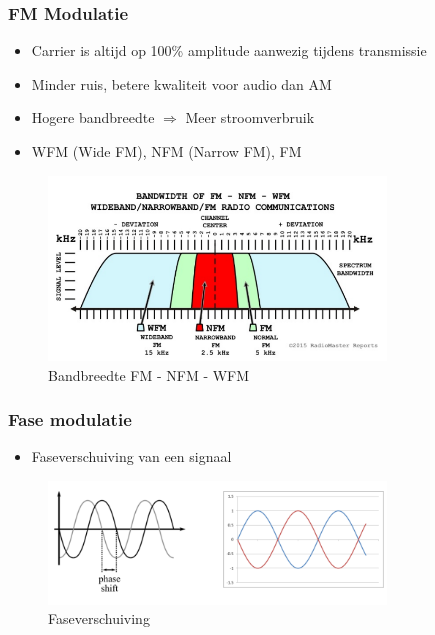 \documentclass{article}
\begin{document}
\subsubsection{FM Modulatie}
\begin{itemize}
    \item Carrier is altijd op 100\% amplitude aanwezig tijdens transmissie
    \item Minder ruis, betere kwaliteit voor audio dan AM
    \item Hogere bandbreedte $\Rightarrow$ Meer stroomverbruik
    \item WFM (Wide FM), NFM (Narrow FM), FM
\end{itemize}

\begin{figure}[H]
    \centering
    \includegraphics[width=0.8\textwidth]{Screenshot_20200302_121650.png}
    \caption{Bandbreedte FM - NFM - WFM}
\end{figure}

\subsubsection{Fase modulatie}
\begin{itemize}
    \item Faseverschuiving van een signaal
\end{itemize}

\begin{figure}[H]
    \centering
    \includegraphics[width=0.8\textwidth]{Screenshot_20200302_121855.png}
    \caption{Faseverschuiving}
\end{figure}
\end{document}
